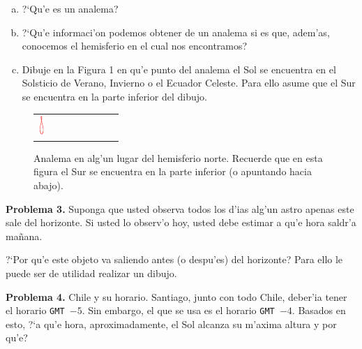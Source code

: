 \documentclass{article}
\begin{document}
\begin{enumerate} [a)]

\item ?`Qu'e es un analema?

\item ?`Qu'e informaci'on podemos obtener de un analema si es que, adem'as, conocemos el hemisferio en el cual nos encontramos?

\item Dibuje en la Figura 1 en qu'e punto del analema el Sol se encuentra en el Solsticio de Verano, Invierno o el Ecuador Celeste. Para ello asume que el Sur se encuentra en la parte inferior del dibujo.
\end{enumerate}

\begin{figure}[!ht]
\begin{center}
\begin{tabular}{ll}
  \includegraphics[width=0.1\textwidth]{Analema.png}
\end{tabular}
\caption{Analema en alg'un lugar del hemisferio norte. Recuerde que en esta figura el Sur se encuentra en la parte inferior (o apuntando hacia abajo).}
\end{center} 
\end{figure}

\newpage

\textbf{Problema 3.} Suponga que usted observa todos los d'ias alg'un astro apenas este sale del horizonte. Si usted lo observ'o hoy, usted debe estimar a qu'e hora saldr'a mañana. 

?`Por qu'e este objeto va saliendo antes (o despu'es) del horizonte? Para ello le puede ser de utilidad realizar un dibujo.

\vspace{3mm}

\textbf{Problema 4.} Chile y su horario. Santiago, junto con todo Chile, deber'ia tener el horario \texttt{GMT $-5$}. Sin embargo, el que se usa es el horario \texttt{GMT $-4$}. Basados en esto, ?`a qu'e hora, aproximadamente, el Sol alcanza su m'axima altura y por qu'e?
\end{document}

